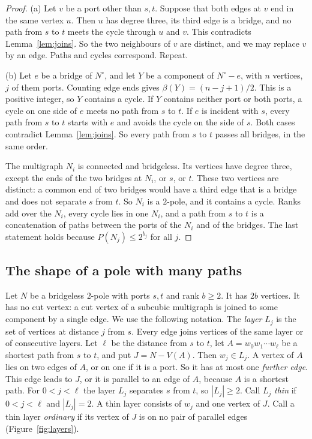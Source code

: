 \begin{proof}
(a) Let $v$ be a port other than $s,t$. Suppose that both edges at $v$ end in the same vertex $u$.
Then $u$ has degree three, its third edge is a bridge, and no path from $s$ to $t$ meets the cycle
through $u$ and $v$. This contradicts Lemma~\ref{lem:joins}. So the two neighbours of $v$ are
distinct, and we may replace $v$ by an edge. Paths and cycles correspond. Repeat.

(b) Let $e$ be a bridge of $N^{\circ}$, and let $Y$ be a component of $N^{\circ}-e$, with $n$
vertices, $j$ of them ports. Counting edge ends gives $\beta(Y)=(n-j+1)/2$. This is a positive
integer, so $Y$ contains a cycle. If $Y$ contains neither port or both ports, a cycle on one side
of $e$ meets no path from $s$ to $t$. If $e$ is incident with $s$, every path from $s$ to $t$
starts with $e$ and avoids the cycle on the side of $s$. Both cases contradict
Lemma~\ref{lem:joins}. So every path from $s$ to $t$ passes all bridges, in the same order.

The multigraph $N_i$ is connected and bridgeless. Its vertices have degree three, except the ends
of the two bridges at $N_i$, or $s$, or $t$. These two vertices are distinct: a common end of two
bridges would have a third edge that is a bridge and does not separate $s$ from $t$. So $N_i$ is a
$2$-pole, and it contains a cycle. Ranks add over the $N_i$, every cycle lies in one $N_i$, and a
path from $s$ to $t$ is a concatenation of paths between the ports of the $N_i$ and of the bridges.
The last statement holds because $P(N_j)\le2^{b_j}$ for all $j$.
\end{proof}

\subsection{The shape of a pole with many paths}\label{sec:shape}

Let $N$ be a bridgeless $2$-pole with ports $s,t$ and rank $b\ge2$. It has $2b$ vertices. It has no
cut vertex: a cut vertex of a subcubic multigraph is joined to some component by a single edge.
We use the following notation. The \emph{layer} $L_j$ is the set of vertices at distance $j$ from
$s$. Every edge joins vertices of the same layer or of consecutive layers. Let $\ell$ be the
distance from $s$ to $t$, let $A=w_0w_1\cdots w_\ell$ be a shortest path from $s$ to $t$, and put
$J=N-V(A)$. Then $w_j\in L_j$. A vertex of $A$ lies on two edges of $A$, or on one if it is a
port. So it has at most one \emph{further edge}. This edge leads to $J$, or it is parallel to an
edge of $A$, because $A$ is a shortest path. For $0<j<\ell$ the layer $L_j$ separates $s$ from $t$,
so $|L_j|\ge2$. Call $L_j$ \emph{thin}
if $0<j<\ell$ and $|L_j|=2$. A thin layer consists of $w_j$ and one vertex of $J$. Call a thin
layer \emph{ordinary} if its vertex of $J$ is on no pair of parallel edges
(Figure~\ref{fig:layers}).

